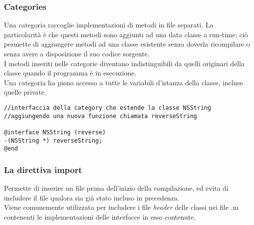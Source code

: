 \subsubsection{Categories}
Una categoria raccoglie implementazioni di metodi in file separati. La particolarità è che questi metodi sono aggiunti ad una data classe a run-time; ciò permette di aggiungere metodi ad una classe esistente senza doverla ricompilare o senza avere a disposizione il suo codice sorgente.\\I metodi inseriti nelle categorie diventano indistinguibili da quelli originari della classe quando il programma è in esecuzione.\\ Una categoria ha pieno accesso a tutte le variabili d'istanza della classe, incluse quelle private. 
\lstset{language=[Objective]C, breakindent=40pt, breaklines}
\begin{lstlisting}
//interfaccia della category che estende la classe NSString
//aggiungendo una nuova funzione chiamata reverseString 

@interface NSString (reverse)
-(NSString *) reverseString;
@end
\end{lstlisting}
\subsubsection{La direttiva import}
Permette di inserire un file prima dell'inizio della compilazione, ed evita di includere il file qualora sia già stato incluso in precedenza.\\Viene comunemente utilizzata per includere i file \textit{header} delle classi nei file .m contenenti le implementazioni delle interfacce in esso contenute.
